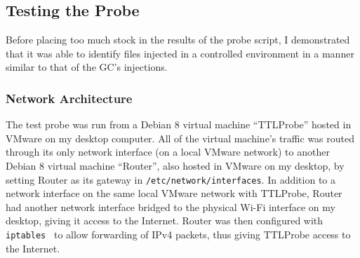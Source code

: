 \subsection{Testing the Probe}\label{testing}
Before placing too much stock in the results of the probe script, I demonstrated that it was able to identify files injected in a controlled environment in a manner similar to that of the GC's injections.
\subsubsection{Network Architecture}
The test probe was run from a Debian 8 virtual machine ``TTLProbe'' hosted in VMware on my desktop computer.
All of the virtual machine's traffic was routed through its only network interface (on a local VMware network) to another Debian 8 virtual machine ``Router'', also hosted in VMware on my desktop, by setting Router as its gateway in \texttt{/etc/network/interfaces}.
In addition to a network interface on the same local VMware network with TTLProbe, Router had another network interface bridged to the physical Wi-Fi interface on my desktop, giving it access to the Internet.
Router was then configured with \texttt{iptables}~\cite{Russell2000} to allow forwarding of IPv4 packets, thus giving TTLProbe access to the Internet.
